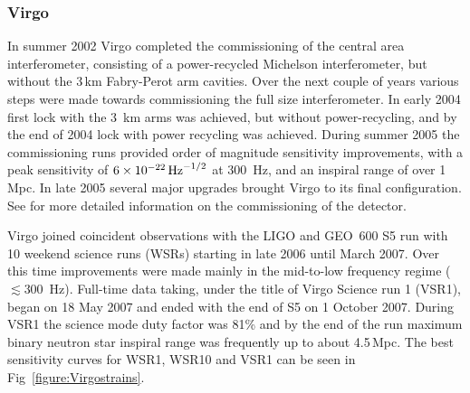 \documentclass{article}
\begin{document}
\subsubsection{Virgo}
In summer 2002 Virgo completed the commissioning of the central area
interferometer, consisting of a power-recycled Michelson interferometer, but
without the 3\,km Fabry-Perot arm cavities. Over the next couple of years
various steps were made towards commissioning the full size interferometer. In
early 2004 first lock with the 3~km arms was achieved, but without
power-recycling, and by the end of 2004 lock with power recycling was achieved.
During summer 2005 the commissioning runs provided order of magnitude
sensitivity improvements, with a peak sensitivity of $6\times10^{-22}\,{\rm
Hz}^{-1/2}$ at 300~Hz, and an inspiral range of over 1\,Mpc. In late 2005
several major upgrades brought Virgo to its final configuration. See
\cite{Acernese:2004, Acernese:2005, Acernese:2006, Acernese:2007} for more
detailed information on the commissioning of the detector.

Virgo joined coincident observations with the LIGO and GEO~600 S5 run with
10 weekend science runs (WSRs) starting in late 2006 until March 2007. Over this
time improvements were made mainly in the mid-to-low frequency regime ($\lesssim
300$~Hz). Full-time data taking, under the title of Virgo Science run 1 (VSR1),
began on 18 May 2007 and ended with the end of S5 on 1 October 2007. During VSR1
the science mode duty factor was 81\% and by the end of the run maximum binary
neutron star inspiral range was frequently up to about 4.5\,Mpc. The best
sensitivity curves for WSR1, WSR10 and VSR1 can be seen in
Fig~\ref{figure:Virgostrains}.

\end{document}
